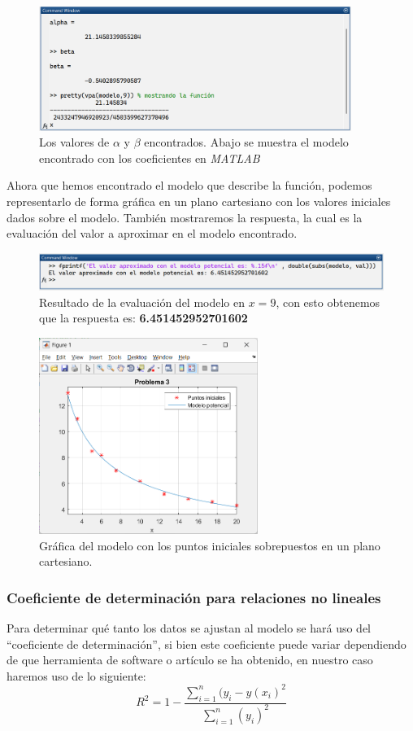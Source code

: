 \documentclass[11pt,letterpaper]{article}
\begin{document}
\begin{figure}[H]
\centering
\includegraphics[width=4in]{ab3.png}
\caption{Los valores de $\alpha$ y $\beta$ encontrados. Abajo se muestra el modelo encontrado con los coeficientes en \textit{MATLAB}}
\label{figure:ab3}
\end{figure}
Ahora que hemos encontrado el modelo que describe la función, podemos representarlo de forma gráfica en un plano cartesiano con los valores iniciales dados sobre el modelo. También mostraremos la respuesta, la cual es la evaluación del valor a aproximar en el modelo encontrado.
\begin{figure}[H]
\centering
\includegraphics[width=6in]{res3.png}
\caption{Resultado de la evaluación del modelo en $x=9$, con esto obtenemos que la respuesta es: \textbf{6.451452952701602}}
\label{figure:res3}
\end{figure}
\begin{figure}[H]
\centering
\includegraphics[width=2.8in]{exp3.png}
\caption{Gráfica del modelo con los puntos iniciales sobrepuestos en un plano cartesiano.}
\label{figure:graf3}
\end{figure}


\subsubsection{Coeficiente de determinación para relaciones no lineales}
Para determinar qué tanto los datos se ajustan al modelo se hará uso del ``coeficiente de determinación'', si bien este coeficiente puede variar dependiendo de que herramienta de software o artículo se ha obtenido, en nuestro caso haremos uso de lo siguiente:
\begin{equation}\label{equation:coeficiente}
	R^2 = 1 - \frac{\sum_{i=1}^{n} (y_i - y(x_i ) ^2 }
	{\sum_{i=1}^{n} (y_i)^2}
\end{equation}
\end{document}
